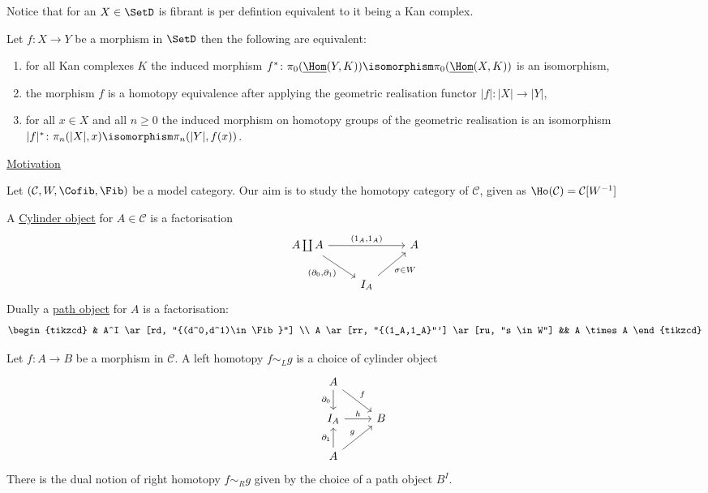 \begin{rmk}
    Notice that for an $X \in \SetD$ is fibrant is per defintion equivalent to it being a Kan complex.
\end{rmk}

\begin{thm}
    Let $f\colon X  \to Y$ be a morphism in $\SetD$ then the following are equivalent:
    \begin{enumerate}
        \item 
        for all Kan complexes $K$ the induced morphism $f^*\colon \pi_0(\underline{\Hom}(Y,K)) \isomorphism \pi_0(\underline{\Hom}(X,K))$ is an isomorphism,
        \item 
        the morphism $f$ is a homotopy equivalence after applying the geometric realisation functor
        $\lvert f \rvert : \lvert X \rvert \to \lvert Y \rvert$,
        \item 
        for all $x \in X$ and all $n \geq 0$ the induced morphism on homotopy groups of the geometric realisation is an isomorphism $\lvert f \rvert^* \colon  \pi_n(\lvert X \rvert, x) \isomorphism \pi_n(\lvert Y \rvert, f(x))$.
    \end{enumerate}
\end{thm}

\underline{Motivation}

Let $(\mathcal{C},W, \Cofib, \Fib)$ be a model category.
Our aim is to study the homotopy category of $\mathcal{C}$, given as $\Ho(\mathcal{C})=\mathcal{C}[W^{-1}]$

\begin{defi}
    A \underline{Cylinder object} for $A \in \mathcal{C}$ is a factorisation 
    \[
    \begin{tikzcd}
        A \coprod A 
        \ar[rr, "{(1_A,1_A)}"]
        \ar[rd, "{(\partial_0, \partial_1)}"']
        &&
        A
        \\
        &
        I_A
        \ar[ru, "\sigma \in W"']
    \end{tikzcd}
    \]
    Dually a \underline{path object} for $A$ is a factorisation:
    \[
    \begin{tikzcd}
        &
        A^I
        \ar[rd, "{(d^0,d^1)\in \Fib}"]
        \\
        A
        \ar[rr, "{(1_A,1_A}"']
        \ar[ru, "s \in W"]
        &&
        A \times A
    \end{tikzcd}
    \]
\end{defi}

\begin{defi}
    Let $f\colon A \to B$ be a morphism in $\mathcal{C}$. 
    A left homotopy $f\sim_Lg$ is a choice of cylinder object 
    \[
    \begin{tikzcd}
        A
        \ar[d, "\partial_0"']
        \ar[rd, "f"]
        \\
        I_A
        \ar[r, "h"]
        &
        B
        \\ 
        A
        \ar[u, "\partial_1"]
        \ar[ru, "g"]
    \end{tikzcd}
    \]
    There is the dual notion of right homotopy $f \sim_R g$ given by the choice of a path object $B^I$.
\end{defi}

